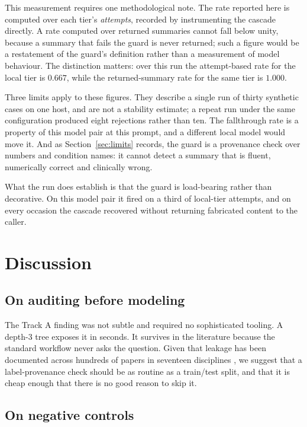 \documentclass[lettersize,journal]{IEEEtran}
\begin{document}
This measurement requires one methodological note. The rate reported here is
computed over each tier's \emph{attempts}, recorded by instrumenting the
cascade directly. A rate computed over returned summaries cannot fall below
unity, because a summary that fails the guard is never returned; such a figure
would be a restatement of the guard's definition rather than a measurement of
model behaviour. The distinction matters: over this run the attempt-based rate
for the local tier is $0.667$, while the returned-summary rate for the same
tier is $1.000$.

Three limits apply to these figures. They describe a single run of thirty
synthetic cases on one host, and are not a stability estimate; a repeat run
under the same configuration produced eight rejections rather than ten. The
fallthrough rate is a property of this model pair at this prompt, and a
different local model would move it. And as Section~\ref{sec:limits} records,
the guard is a provenance check over numbers and condition names: it cannot
detect a summary that is fluent, numerically correct and clinically wrong.

What the run does establish is that the guard is load-bearing rather than
decorative. On this model pair it fired on a third of local-tier attempts, and
on every occasion the cascade recovered without returning fabricated content to
the caller.


\section{Discussion}

\subsection{On auditing before modeling}

The Track A finding was not subtle and required no sophisticated tooling. A
depth-3 tree exposes it in seconds. It survives in the literature because the
standard workflow never asks the question. Given that leakage has been
documented across hundreds of papers in seventeen disciplines \cite{kapoor2023},
we suggest that a label-provenance check should be as routine as a train/test
split, and that it is cheap enough that there is no good reason to skip it.

\subsection{On negative controls}
\end{document}

